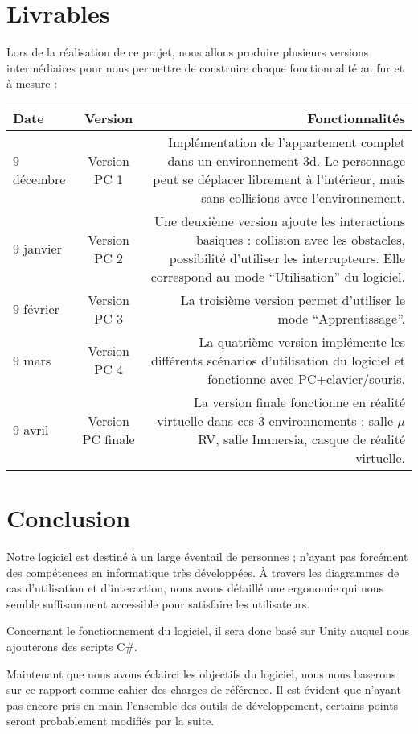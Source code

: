 \section{Livrables}
Lors de la réalisation de ce projet, nous allons produire plusieurs versions intermédiaires pour nous permettre de construire chaque fonctionnalité au fur et à mesure :
\begin{tabular}{|l|c|r|}
  \hline
  Date & Version & Fonctionnalités \\
  \hline
  9 décembre & Version PC 1 & Implémentation de l'appartement complet dans un environnement 3d. Le personnage peut se déplacer librement à l'intérieur, mais sans collisions avec l'environnement. \\
  9 janvier & Version PC 2 & Une deuxième version ajoute les interactions basiques : collision avec les obstacles, possibilité d'utiliser les interrupteurs. Elle correspond au mode \enquote{Utilisation} du logiciel. \\
  9 février & Version PC 3 & La troisième version permet d'utiliser le mode \enquote{Apprentissage}. \\
  9 mars & Version PC 4 & La quatrième version implémente les différents scénarios d'utilisation du logiciel et fonctionne avec PC+clavier/souris. \\
  9 avril & Version PC finale & La version finale fonctionne en réalité virtuelle dans ces 3 environnements : salle $\mu$RV, salle Immersia, casque de réalité virtuelle.\\
  \hline
\end{tabular}

\section{Conclusion}
Notre logiciel est destiné à un large éventail de personnes ; n'ayant pas forcément des compétences en informatique très développées.
\`A travers les diagrammes de cas d'utilisation et d'interaction, nous avons détaillé une ergonomie qui nous semble suffisamment accessible pour satisfaire les utilisateurs.

Concernant le fonctionnement du logiciel, il sera donc basé sur Unity auquel nous ajouterons des scripts C\#.

Maintenant que nous avons éclairci les objectifs du logiciel, nous nous baserons sur ce rapport comme cahier des charges de référence. Il est évident que n'ayant pas encore pris en main l'ensemble des outils de développement, certains points seront probablement modifiés par la suite.




